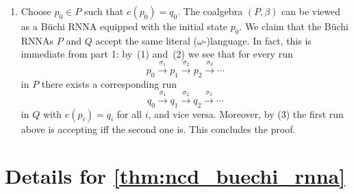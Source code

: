 \documentclass[final,a4paper,UKenglish,thm-restate,autoref,numberwithinsect]{lipics-v2021}
\newcommand{\scriptmidmid}{\hspace{0.2ex}{\rule[-0.1ex]{0.6pt}{1.1ex}}\hspace{0.2ex}}
\newcommand{\scriptnew}[1]{{\scriptmidmid}#1}
\numberwithin{equation}{section}
\newcommand{\xto}[1]{\xrightarrow{~#1~}}
\newcommand{\braket}[1]{\langle #1 \rangle}
\newcommand{\+}[1]{\mathcal{#1}\xspace}
\newcommand{\names}{\mathbb{A}}
\DeclareMathOperator{\supp}{\mathsf{supp}} %
\newcommand{\fresh}{\mathbin{\#}}
\theoremstyle{definition}
\begin{document}
\begin{enumerate}
    \smallskip\noindent Ad~(1). If $p\xto{\scriptnew a} r$ in $P$ we have
    $\braket{a} r\in \beta_r(p)$. Thus,
    $\braket{a} e(r) = [\names]e(\braket{a} r)\in \gamma_r(e(p))$
    by~\eqref{eq:coalg-morphism}. This shows $e(p)\xto{\scriptnew a} e(r)$ in
    $Q$.

    \smallskip\noindent Ad~(2). If $e(p)\xto{\scriptnew a} q$ in $Q$ we have
    $\braket{a}q\in \gamma_r(e(p))$. From \eqref{eq:coalg-morphism} it
    follows that there exists $b\in \names$ and $r\in P$ such that
    $\braket{b}r\in \beta_r(p)$ and $\braket{a}q = \braket{b}e(r)$. If
    $a=b$, this implies $p\xto{\scriptnew a}r$ in $P$ and $q=e(r)$, and we are
    done. If $a\neq b$, we have $a\fresh e(r)$ because
    $\supp(q)\setminus \{a\} = \supp(e(r))\setminus \{b\}$. Since $e$
    is $\supp$-nondecreasing, this implies $a\fresh r$. Therefore
    $\braket{a}(a\, b)r = \braket{b} r \in \beta_r(p)$,
    i.e.~$p\xto{\scriptnew a}(a\, b)r$ in $P$. Moreover, we have
    $\braket{a}q = \braket{b}e(r) = \braket{a}(a\, b)e(r) =
    \braket{a}e((a\,b)r)$ and therefore $e((a\,b)r)=q$, as required.

  \item Choose $p_0\in P$ such that $e(p_0)=q_0$. The coalgebra
    $(P,\beta)$ can be viewed as a Büchi RNNA equipped with the initial
    state $p_0$. We claim that the Büchi RNNAs $P$ and $Q$ accept the same
    literal ($\omega$-)language. In fact, this is immediate from part
    1: by~(1) and~(2) we see that for every run
    \[
      p_0 \xto{\sigma_1} p_1 \xto{\sigma_2} p_2 \xto{\sigma_3} \cdots
    \]
    in $P$ there exists a corresponding run
    \[
      q_0 \xto{\sigma_1} q_1 \xto{\sigma_2} q_2 \xto{\sigma_3} \cdots
    \]
    in $Q$ with $e(p_i)=q_i$ for all $i$, and vice versa. Moreover, by
    (3) the first run above is accepting iff the second one
    is. This concludes the proof. \qedhere
  \end{enumerate}

\section*{Details for \autoref{thm:ncd_buechi_rnna}}
\end{document}
